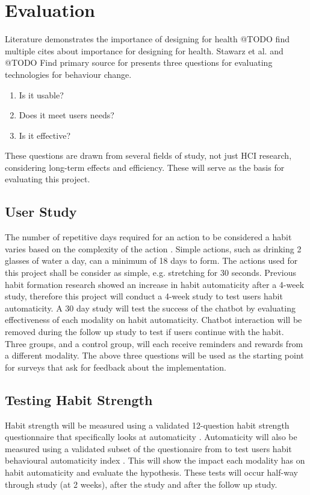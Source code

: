
\newpage
\section{Evaluation}

Literature demonstrates the importance of designing for health @TODO find multiple cites about importance for designing for health. Stawarz et al. \cite{article_designing_for_health_behaviour_change_hci} and @TODO Find primary source for \cite{article_designing_for_health_behaviour_change_hci} presents three questions for evaluating technologies for behaviour change.
\begin{enumerate}
\item Is it usable?
\item Does it meet users needs?
\item Is it effective?
\end{enumerate}
These questions are drawn from several fields of study, not just HCI research, considering long-term effects and efficiency. These will serve as the basis for evaluating this project.

\subsection{User Study}
The number of repetitive days required for an action to be considered a habit varies based on the complexity of the action \cite{article_how_habits_formed_modelling_habit_formation}. Simple actions, such as drinking 2 glasses of water a day, can a minimum of 18 days to form. The actions used for this project shall be consider as simple, e.g. stretching for 30 seconds. Previous habit formation research \cite{article_beyond_self_tracking_designing_apps} showed an increase in habit automaticity after a 4-week study, therefore this project will conduct a 4-week study to test users habit automaticity.\newline
\newline
A 30 day study will test the success of the chatbot by evaluating effectiveness of each modality on habit automaticity. Chatbot interaction will be removed during the follow up study to test if users continue with the habit. Three groups, and a control group, will each receive reminders and rewards from a different modality. The above three questions will be used as the starting point for surveys that ask for feedback about the implementation.

\subsection{Testing Habit Strength}
 Habit strength will be measured using a validated 12-question habit strength questionnaire that specifically looks at automaticity \cite{article_habit_strength}. Automaticity will also be measured using a validated subset of the questionaire from \cite{article_habit_strength} to test users habit behavioural automaticity index \cite{article_habit_measurement}. This will show the impact each modality has on habit automaticity and evaluate the hypothesis. These tests \cite{article_habit_strength, article_habit_measurement} will occur half-way through study (at 2 weeks), after the study and after the follow up study.